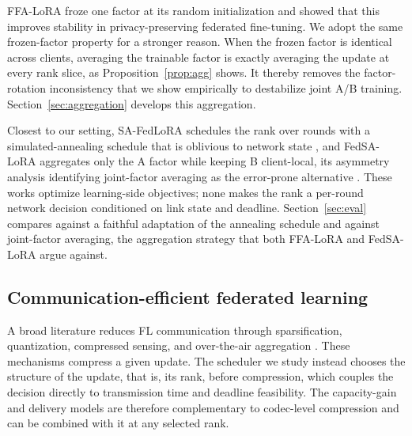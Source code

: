 \documentclass[preprint,12pt]{elsarticle}
\begin{document}
FFA-LoRA \cite{sun2024ffalora} froze one factor at its random initialization and showed that this improves stability in privacy-preserving federated fine-tuning. We adopt the same frozen-factor property for a stronger reason. When the frozen factor is identical across clients, averaging the trainable factor is exactly averaging the update at every rank slice, as Proposition~\ref{prop:agg} shows. It thereby removes the factor-rotation inconsistency that we show empirically to destabilize joint A/B training. Section~\ref{sec:aggregation} develops this aggregation.

Closest to our setting, SA-FedLoRA schedules the rank over rounds with a simulated-annealing schedule that is oblivious to network state \cite{yang2024safedlora}, and FedSA-LoRA aggregates only the A factor while keeping B client-local, its asymmetry analysis identifying joint-factor averaging as the error-prone alternative \cite{guo2025fedsalora}. These works optimize learning-side objectives; none makes the rank a per-round network decision conditioned on link state and deadline. Section~\ref{sec:eval} compares against a faithful adaptation of the annealing schedule and against joint-factor averaging, the aggregation strategy that both FFA-LoRA and FedSA-LoRA argue against.

\subsection{Communication-efficient federated learning}
A broad literature reduces FL communication through sparsification, quantization, compressed sensing, and over-the-air aggregation \cite{oh2023fedqcs,oh2024fedvqcs,liu2023adaptivequant,kim2023beamforming,reisizadeh2020fedpaq,lin2018deep}. These mechanisms compress a given update. The scheduler we study instead chooses the structure of the update, that is, its rank, before compression, which couples the decision directly to transmission time and deadline feasibility. The capacity-gain and delivery models are therefore complementary to codec-level compression and can be combined with it at any selected rank.
\end{document}
